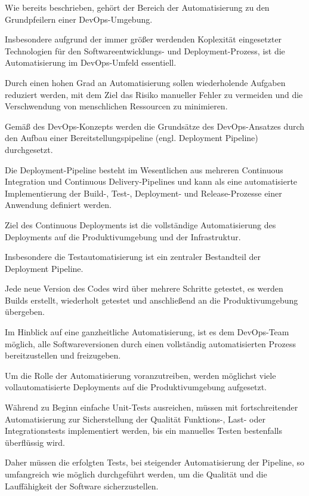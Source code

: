 Wie bereits beschrieben, gehört der Bereich der Automatisierung zu den Grundpfeilern einer DevOps-Umgebung. 

Insbesondere aufgrund der immer größer werdenden Koplexität eingesetzter Technologien für den Softwareentwicklungs- und Deployment-Prozess, ist die Automatisierung im DevOps-Umfeld essentiell. 

Durch einen hohen Grad an Automatisierung sollen wiederholende Aufgaben reduziert werden, mit dem Ziel das Risiko manueller Fehler zu vermeiden und die Verschwendung von menschlichen Ressourcen zu minimieren.  

Gemäß des DevOps-Konzepts werden die Grundsätze des DevOps-Ansatzes durch den Aufbau einer Bereitstellungspipeline (engl. Deployment Pipeline) durchgesetzt.

Die Deployment-Pipeline besteht im Wesentlichen aus mehreren Continuous Integration und Continuous Delivery-Pipelines und kann als eine automatisierte Implementierung der Build-, Test-, Deployment- und Release-Prozesse einer Anwendung definiert werden. \cite{humble_why_2011}

Ziel des Continuous Deployments ist die vollständige Automatisierung des Deployments auf die Produktivumgebung und der Infrastruktur. 

Insbesondere die Testautomatisierung ist ein zentraler Bestandteil der Deployment Pipeline.

Jede neue Version des Codes wird über mehrere Schritte getestet, es werden Builds erstellt, wiederholt getestet und anschließend an die Produktivumgebung übergeben.

Im Hinblick auf eine ganzheitliche Automatisierung, ist es dem DevOps-Team möglich, alle Softwareversionen durch einen vollständig automatisierten Prozess bereitzustellen und freizugeben. 

Um die Rolle der Automatisierung voranzutreiben, werden möglichst viele vollautomatisierte Deployments auf die Produktivumgebung aufgesetzt. 

Während zu Beginn einfache Unit-Tests ausreichen, müssen mit fortschreitender Automatisierung zur Sicherstellung der Qualität Funktions-, Last- oder Integrationstests implementiert werden, bis ein manuelles Testen bestenfalls überflüssig wird. \cite[S. 27]{alt_innovationsorientiertes_2017}

Daher müssen die erfolgten Tests, bei steigender Automatisierung der Pipeline, so umfangreich wie möglich durchgeführt werden, um die Qualität und die Lauffähigkeit der Software sicherzustellen. \cite[S. 110 - 111]{wolff_continuous_2016}

